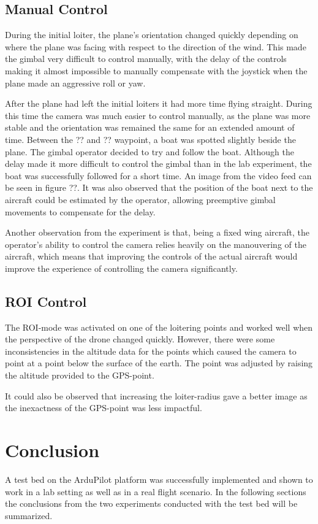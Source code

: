 \documentclass[nofilelist]{cslthse-msc}
\begin{document}
\section{Manual Control}
During the initial loiter, the plane's orientation changed quickly depending on where the plane was facing with respect to the direction of the wind. This made the gimbal very difficult to control manually, with the delay of the controls making it almost impossible to manually compensate with the joystick when the plane made an aggressive roll or yaw.

After the plane had left the initial loiters it had more time flying straight. During this time the camera was much easier to control manually, as the plane was more stable and the orientation was remained the same for an extended amount of time. 
Between the ?? and ?? waypoint, a boat was spotted slightly beside the plane. The gimbal operator decided to try and follow the boat. Although the delay made it more difficult to control the gimbal than in the lab experiment, the boat was successfully followed for a short time. An image from the video feed can be seen in figure ??. It was also observed that the position of the boat next to the aircraft could be estimated by the operator, allowing preemptive gimbal movements to compensate for the delay. 

Another observation from the experiment is that, being a fixed wing aircraft, the operator's ability to control the camera relies heavily on the manouvering of the aircraft, which means that improving the controls of the actual aircraft would improve the experience of controlling the camera significantly. 

\section{ROI Control}
The ROI-mode was activated on one of the loitering points and worked well when the perspective of the drone changed quickly. However, there were some inconsistencies in the altitude data for the points which caused the camera to point at a point below the surface of the earth. The point was adjusted by raising the altitude provided to the GPS-point. 

It could also be observed that increasing the loiter-radius gave a better image as the inexactness of the GPS-point was less impactful.

\chapter{Conclusion}
A test bed on the ArduPilot platform was successfully implemented and shown to work in a lab setting as well as in a real flight scenario. In the following sections the conclusions from the two experiments conducted with the test bed will be summarized.
\end{document}
